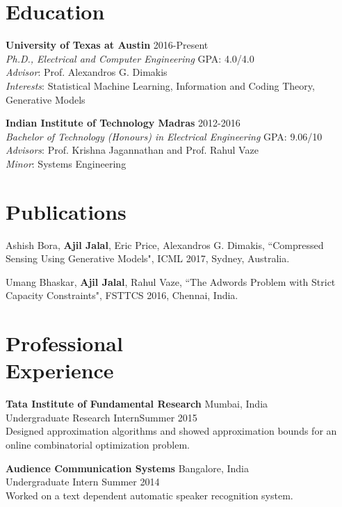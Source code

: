 \documentclass[margin, 11pt]{res} %
\begin{document}
\begin{resume}

 
\section{\large Education}
{\bf University of Texas at Austin} \hfill 2016-Present\\
{\sl Ph.D., Electrical and Computer Engineering} \hfill GPA: 4.0/4.0 \\
{\sl Advisor}: Prof. Alexandros G. Dimakis \\
{\sl Interests}: Statistical Machine Learning, Information and Coding Theory, Generative Models

{\bf Indian Institute of Technology Madras} \hfill 2012-2016\\
{\sl Bachelor of Technology (Honours) in Electrical Engineering} \hfill GPA: 9.06/10 \\
{\sl Advisors}: Prof. Krishna Jagannathan and Prof. Rahul Vaze \\
{\sl Minor}: Systems Engineering 

\section{\large Publications} 
Ashish Bora, {\bf Ajil Jalal}, Eric Price, Alexandros G. Dimakis, ``Compressed Sensing Using Generative Models", ICML 2017, Sydney, Australia.

Umang Bhaskar, {\bf Ajil Jalal}, Rahul Vaze, ``The Adwords Problem with Strict Capacity Constraints", FSTTCS 2016, Chennai, India.


\section{\large Professional \\ Experience} 
{\bf Tata Institute of Fundamental Research} \hfill Mumbai, India\\
Undergraduate Research Intern\hfill Summer 2015\\
Designed approximation algorithms and showed approximation bounds for an online combinatorial optimization problem.

{\bf Audience Communication Systems} \hfill Bangalore, India\\
Undergraduate Intern \hfill Summer 2014\\
Worked on a text dependent automatic speaker recognition system.


\end{resume}
\end{document}

